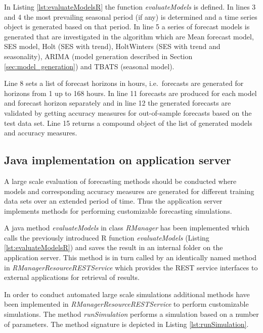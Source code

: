 In Listing \ref{lst:evaluateModelsR} the function \textit{evaluateModels} is defined. In lines 3 and 4 the most prevailing seasonal period (if any) is determined and 
a time series object is generated based on that period. In line 5 a series of forecast models is generated that are investigated in the algorithm which are Mean forecast model, SES model, Holt (SES with trend), HoltWinters (SES with trend and seasonality), ARIMA (model generation described in Section \ref{sec:model_generation}) and TBATS (seasonal model). 

Line 8 sets a list of forecast horizons in hours, i.e.~forecasts are generated for horizons from 1 up to 168 hours. In line 11 forecasts are produced for each model and forecast horizon separately and in line 12 the generated forecasts are validated by getting accuracy measures for out-of-sample forecasts based on the test data set. 
Line 15 returns a compound object of the list of generated models and accuracy measures. 



\subsection{Java implementation on application server} \label{ssec:java_implementation_on_application_server}

A large scale evaluation of forecasting methods should be conducted where models and corresponding accuracy measures are generated for different training data sets over an extended period of time. 
Thus the application server implements methods for performing customizable forecasting simulations. 

A java method \textit{evaluateModels} in class \textit{RManager} has been implemented which calls the previously introduced R function \textit{evaluateModels} (Listing \ref{lst:evaluateModelsR}) and saves the result in an internal folder on the application server. 
This method is in turn called by an identically named method in \textit{RManagerResourceRESTService} which provides the REST service interfaces to external applications for retrieval of results. 

In order to conduct automated large scale simulations additional methods have been implemented in \textit{RManagerResourceRESTService} to perform customizable simulations. The method \textit{runSimulation} performs a simulation based on a number of parameters. The method signature is depicted in Listing \ref{lst:runSimulation}. 

